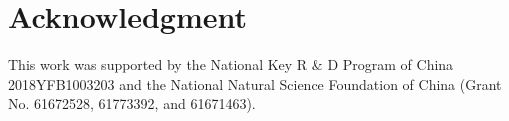 \documentclass{article}
\begin{document}
\section*{Acknowledgment}

This work was supported by the National Key R \& D Program of China 2018YFB1003203 and the National Natural Science Foundation of China (Grant No. 61672528, 61773392, and 61671463). 


\balance


















\end{document}
